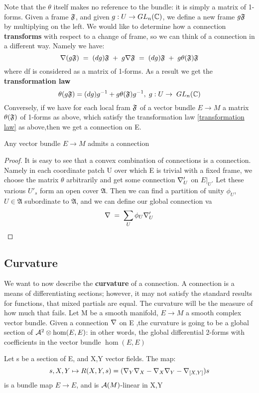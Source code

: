 Note that the $\theta$ itself makes no reference to the bundle: it is simply a matrix of 1-forms.
Given a frame $\mathfrak{F}$, and given $g:U \rightarrow GL_n(\mathbb{C})$, we define a new frame $g\mathfrak{F}$ by multiplying on the left.
We would like to determine how a connection {\bf transforms} with respect to a change of frame, so we can think of a 
connection
in a different way. Namely we have:
$$\nabla (g \mathfrak{F})\;=\;(dg)\mathfrak{F} \;+\;g\nabla \mathfrak{F}\;=\;(dg)\mathfrak{F}\;+\;g\theta(\mathfrak{F})\mathfrak{F}$$
where df is considered as a matrix of 1-forms. As a result we get the {\bf transformation law}
\begin{equation} \label{transformation law}
 \theta(g\mathfrak{F}) = (dg)g^{-1} + g\theta(\mathfrak{F})g^{-1},\;g:U\to\;GL_n(\mathbb{C})
\end{equation}
Conversely, if we have for each local fram $\mathfrak{F}$ of a vector bundle $E\to M$ a matrix $\theta(\mathfrak{F})$ of 1-forms as above,
which satisfy the transformation law \ref{transformation law} as above,then we get a connection on E.
\begin{proposition}
 Any vector bundle $E\to M$ admits a connection
\end{proposition}
\begin{proof}
 It is easy to see that a convex combination of connections is a connection. Namely in each coordinate patch U over which E 
is
 trivial
with a fixed frame, we choose the matrix $\theta$ arbitrarily and get some connection $\nabla'_U$ on $E|_U$. Let these 
various 
$U'_s$ form an open cover $\mathfrak{A}$.
   Then we can find a partition of unity $\phi_U$, $U\in\mathfrak{A}$ subordinate to $\mathfrak{A}$, and we can define our
 global
connection va 
$$\nabla \;=\;\sum_U \phi_U \nabla'_U $$
\end{proof}

\subsection{Curvature}
We want to now describe the {\bf curvature} of a connection. A connection is a means of differentiating sections; 
however, it 
may not satisfy the standard results for functions, that mixed partials are equal. The curvature will be the measure of how
 much
that fails. Let M be a smooth manifold, $E\to M$ a smooth complex vector bundle. Given a connection $\nabla$ on E 
,the curvature is going to be a global section of $\mathcal{A}^{2}\otimes\hom(E,E)$: in other words, the global differential
2-forms with coefficients in the vector bundle $\hom(E,E)$

\begin{proposition}
 Let s be a section of E, and X,Y vector fields.
The map:
$$s,X,Y \mapsto R(X,Y,s)=(\nabla_Y \nabla_X - \nabla_X \nabla_Y - \nabla_{[X,Y]})s$$
is a bundle map $E \to E$, and is $\mathcal{A}(M)$-linear in X,Y
\end{proposition}

